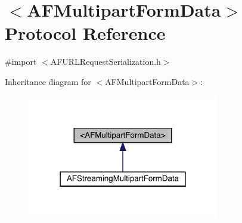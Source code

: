 \hypertarget{protocol_a_f_multipart_form_data-p}{}\section{$<$A\+F\+Multipart\+Form\+Data$>$ Protocol Reference}
\label{protocol_a_f_multipart_form_data-p}


{\ttfamily \#import $<$A\+F\+U\+R\+L\+Request\+Serialization.\+h$>$}



Inheritance diagram for $<$A\+F\+Multipart\+Form\+Data$>$\+:\nopagebreak
\begin{figure}[H]
\begin{center}
\leavevmode
\includegraphics[width=237pt]{protocol_a_f_multipart_form_data-p__inherit__graph}
\end{center}
\end{figure}
